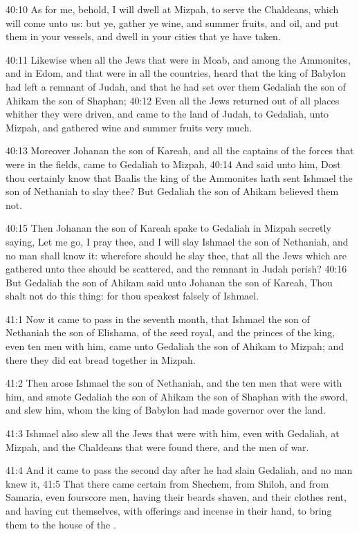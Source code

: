 40:10 As for me, behold, I will dwell at Mizpah, to serve the
Chaldeans, which will come unto us: but ye, gather ye wine, and summer
fruits, and oil, and put them in your vessels, and dwell in your
cities that ye have taken.

40:11 Likewise when all the Jews that were in Moab, and among the
Ammonites, and in Edom, and that were in all the countries, heard that
the king of Babylon had left a remnant of Judah, and that he had set
over them Gedaliah the son of Ahikam the son of Shaphan; 40:12 Even
all the Jews returned out of all places whither they were driven, and
came to the land of Judah, to Gedaliah, unto Mizpah, and gathered wine
and summer fruits very much.

40:13 Moreover Johanan the son of Kareah, and all the captains of the
forces that were in the fields, came to Gedaliah to Mizpah, 40:14 And
said unto him, Dost thou certainly know that Baalis the king of the
Ammonites hath sent Ishmael the son of Nethaniah to slay thee? But
Gedaliah the son of Ahikam believed them not.

40:15 Then Johanan the son of Kareah spake to Gedaliah in Mizpah
secretly saying, Let me go, I pray thee, and I will slay Ishmael the
son of Nethaniah, and no man shall know it: wherefore should he slay
thee, that all the Jews which are gathered unto thee should be
scattered, and the remnant in Judah perish?  40:16 But Gedaliah the
son of Ahikam said unto Johanan the son of Kareah, Thou shalt not do
this thing: for thou speakest falsely of Ishmael.

41:1 Now it came to pass in the seventh month, that Ishmael the son of
Nethaniah the son of Elishama, of the seed royal, and the princes of
the king, even ten men with him, came unto Gedaliah the son of Ahikam
to Mizpah; and there they did eat bread together in Mizpah.

41:2 Then arose Ishmael the son of Nethaniah, and the ten men that
were with him, and smote Gedaliah the son of Ahikam the son of Shaphan
with the sword, and slew him, whom the king of Babylon had made
governor over the land.

41:3 Ishmael also slew all the Jews that were with him, even with
Gedaliah, at Mizpah, and the Chaldeans that were found there, and the
men of war.

41:4 And it came to pass the second day after he had slain Gedaliah,
and no man knew it, 41:5 That there came certain from Shechem, from
Shiloh, and from Samaria, even fourscore men, having their beards
shaven, and their clothes rent, and having cut themselves, with
offerings and incense in their hand, to bring them to the house of the
\LORD.

